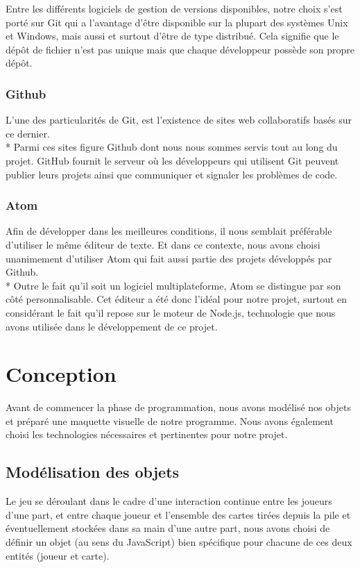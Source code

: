 \documentclass[12pt]{report}
\begin{document}
	 		Entre les différents logiciels de gestion de versions disponibles, notre choix s’est porté sur Git qui a l’avantage d’être disponible sur la plupart des systèmes Unix et Windows, mais aussi et surtout d’être de type distribué. Cela signifie que le dépôt de fichier n’est pas unique mais que chaque développeur possède son propre dépôt.

 			\subsection*{Github}
   		L’une des particularités de Git, est l’existence de sites web collaboratifs basés sur ce dernier.\\* Parmi ces sites figure Github dont nous nous sommes servis tout  au long du projet.
   		GitHub fournit le serveur où les développeurs qui utilisent Git peuvent publier leurs projets ainsi que communiquer et signaler les problèmes de code.

 			\subsection*{Atom}
   		Afin de développer dans les meilleures conditions, il nous semblait préférable d’utiliser le même éditeur de texte.
   		Et dans ce contexte, nous avons choisi unanimement d’utiliser Atom qui fait aussi partie des projets développés  par Github.\\*
   		Outre le fait qu’il soit un logiciel multiplateforme, Atom se distingue par son côté personnalisable.
   		Cet éditeur a été donc l’idéal pour notre projet, surtout en considérant le fait qu’il repose sur le moteur de Node.js, technologie que nous avons utilisée dans le développement de ce projet.


\chapter{Conception}

	Avant de commencer la phase de programmation, nous avons modélisé nos objets et préparé une maquette visuelle de notre programme. Nous avons également choisi les technologies nécessaires et pertinentes pour notre projet.

  \section{Modélisation des objets}
	Le jeu se déroulant dans le cadre d'une interaction continue entre les joueurs d'une part, et entre chaque joueur et l'ensemble des cartes tirées depuis la pile et éventuellement stockées dans sa main d'une autre part, nous avons choisi de définir un objet (au sens du JavaScript) bien spécifique pour chacune de ces deux entités (joueur et carte).
\end{document}
